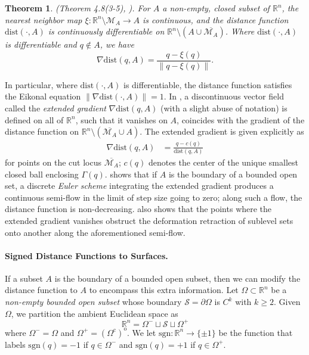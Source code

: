 \documentclass[11pt]{article}
\newcommand{\R}{\mathbb{R}}
\newcommand{\sgn}{\mathrm{sgn}}
\newcommand{\cutlocus}[1]{\overline{\mathcal{M}_{#1}}}
\newcommand{\W}{\Omega}
\newcommand{\bord}{\partial}
\newcommand{\union}{\cup}
\newcommand{\dist}{\mathrm{dist}}
\newcommand{\Surf}{\mathcal{S}}
\theoremstyle{plain}
\newtheorem{thm}{Theorem}
\theoremstyle{definition}
\theoremstyle{remark}
\begin{document}
\begin{thm} \emph{(Theorem 4.8(3-5), {\cite{federer1959curvature}})}.
    For $A$ a non-empty, closed subset of $\R^n$, the nearest neighbor map $\xi: \R^n \setminus \mathcal{M}_{A} \to A$ is continuous, and the distance function $\dist(\cdot, A)$ is continuously differentiable on $ \R^n \setminus (A \union \cutlocus{A})$. Where $\dist(\cdot, A)$ is differentiable and $q \notin A$, we have
    \begin{equation}
         \nabla \dist(q, A) = \frac{q - \xi(q)}{\| q - \xi(q) \|}.\label{eq:classic_grad_dist}
    \end{equation}
\end{thm}
In particular, where $\dist(\cdot, A)$ is differentiable, the distance function satisfies the Eikonal equation $\| \nabla \dist(\cdot, A) \| = 1$. In \cite{lieutier_any_2003}, a discontinuous vector field called the \emph{extended gradient} $\nabla \dist(q,A)$ (with a slight abuse of notation) is defined on all of $\R^n$, such that it vanishes on $A$, coincides with the gradient of the distance function on $\R^n \setminus (\cutlocus{A} \cup A)$. The extended gradient is given explicitly as 
\begin{align}\label{eq:extend_grad_dist}
	\nabla \dist(q,A) &= \frac{q - c(q)}{\dist(q,A)}
\end{align}
for points on the cut locus $\cutlocus{A}$; $c(q)$ denotes the center of the unique smallest closed ball enclosing $\Gamma(q)$. \cite{lieutier_any_2003} shows that if $A$ is the boundary of a bounded open set, a discrete \emph{Euler scheme} integrating the extended gradient produces a continuous semi-flow in the limit of step size going to zero; along such a flow, the distance function is non-decreasing. \cite{lieutier_any_2003} also shows that the points where the extended gradient vanishes obstruct the deformation retraction of sublevel sets onto another along the aforementioned semi-flow. 


\paragraph{Signed Distance Functions to Surfaces.}
\label{sec:properties_signed_dist}
If a subset $A$ is the boundary of a bounded open subset, then we can modify the distance function to $A$ to encompass this extra information. Let $\W \subset \R^n$ be a \textit{non-empty bounded open subset} whose boundary  $\Surf = \bord \W$ is $C^k$ with $k \geq 2$. Given $\W$, we partition the ambient Euclidean space as
\begin{equation} \label{eq:partition}
    \R^n = \W^- \sqcup \Surf \sqcup \W^+
\end{equation}
where $\W^- = \W$ and $\W^+ = (\W^\mathrm{c})^\mathrm{o}$. We let $\sgn: \R^n \to \{\pm 1\}$ be the function that labels $\sgn(q) = - 1$ if $q \in \W^-$ and $\sgn(q) = +1$ if $q \in \W^+$. 
\end{document}
